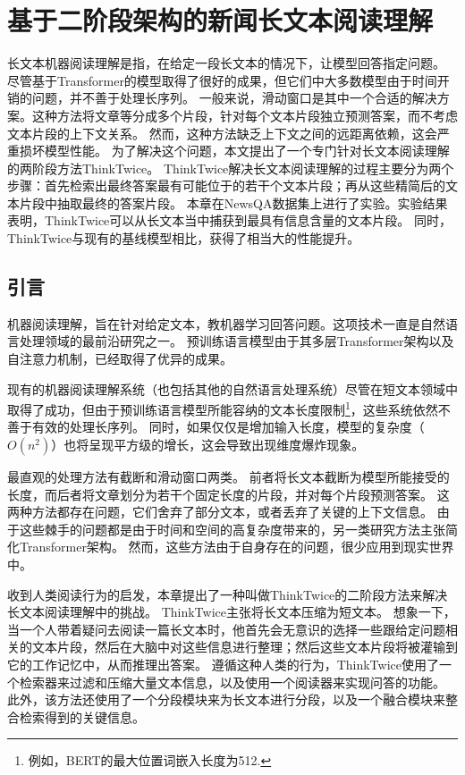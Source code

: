 \chapter{基于二阶段架构的新闻长文本阅读理解}
长文本机器阅读理解是指，在给定一段长文本的情况下，让模型回答指定问题。
尽管基于Transformer的模型取得了很好的成果，但它们中大多数模型由于时间开销的问题，并不善于处理长序列。
一般来说，滑动窗口是其中一个合适的解决方案。这种方法将文章等分成多个片段，针对每个文本片段独立预测答案，而不考虑文本片段的上下文关系。
然而，这种方法缺乏上下文之间的远距离依赖，这会严重损坏模型性能。
为了解决这个问题，本文提出了一个专门针对长文本阅读理解的两阶段方法ThinkTwice。
ThinkTwice解决长文本阅读理解的过程主要分为两个步骤：首先检索出最终答案最有可能位于的若干个文本片段；再从这些精简后的文本片段中抽取最终的答案片段。
本章在NewsQA数据集上进行了实验。实验结果表明，ThinkTwice可以从长文本当中捕获到最具有信息含量的文本片段。
同时，ThinkTwice与现有的基线模型相比，获得了相当大的性能提升。

\section{引言}
机器阅读理解\cite{hermann2015teaching}，旨在针对给定文本，教机器学习回答问题。这项技术一直是自然语言处理领域的最前沿研究之一。
预训练语言模型由于其多层Transformer架构以及自注意力机制\cite{vaswani2017attention}，已经取得了优异的成果。

现有的机器阅读理解系统（也包括其他的自然语言处理系统）尽管在短文本领域中取得了成功，但由于预训练语言模型所能容纳的文本长度限制\footnote{例如，BERT的最大位置词嵌入长度为512.}，这些系统依然不善于有效的处理长序列。
同时，如果仅仅是增加输入长度，模型的复杂度（$O(n^2)$）也将呈现平方级的增长，这会导致出现维度爆炸现象。

最直观的处理方法有截断\cite{rajpurkar2016squad,xie2019unsupervised}和滑动窗口\cite{joshi2019bert}两类。
前者将长文本截断为模型所能接受的长度，而后者将文章划分为若干个固定长度的片段，并对每个片段预测答案。
这两种方法都存在问题，它们舍弃了部分文本，或者丢弃了关键的上下文信息。
由于这些棘手的问题都是由于时间和空间的高复杂度带来的，另一类研究方法主张简化Transformer架构\cite{beltagy2020longformer,zaheer2020big,ding2020ernie}。
然而，这些方法由于自身存在的问题，很少应用到现实世界中。

收到人类阅读行为的启发，本章提出了一种叫做ThinkTwice的二阶段方法来解决长文本阅读理解中的挑战。
ThinkTwice主张将长文本压缩为短文本。
想象一下，当一个人带着疑问去阅读一篇长文本时，他首先会无意识的选择一些跟给定问题相关的文本片段，然后在大脑中对这些信息进行整理；然后这些文本片段将被灌输到它的工作记忆\cite{atkinson1968human}中，从而推理出答案。
遵循这种人类的行为，ThinkTwice使用了一个检索器来过滤和压缩大量文本信息，以及使用一个阅读器来实现问答的功能。
此外，该方法还使用了一个分段模块来为长文本进行分段，以及一个融合模块来整合检索得到的关键信息。


